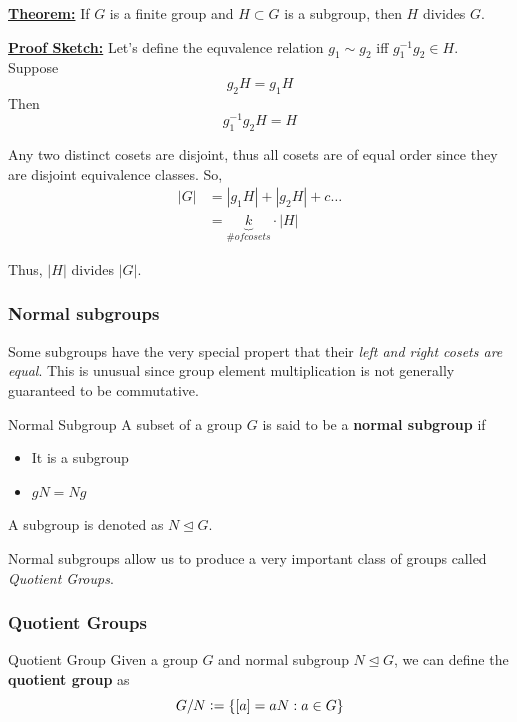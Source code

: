 \documentclass{article}
\newcommand{\defeq}{\vcentcolon=}
\begin{document}
\vskip 0.5cm
\begin{dottedbox}
  \underline{\textbf{Theorem:}} If $G$ is a finite group and $H \subset G$ is a subgroup, then $H$ divides $G$.

  \vskip 0.5cm
  \underline{\textbf{Proof Sketch:}} Let's define the equvalence relation $g_1 \sim g_2$ iff $g_1^{-1} g_2 \in H$. Suppose 
  \[ g_2 H = g_1 H \]
  Then 
  \[ g_1^{-1}g_2 H = H \]
  
  Any two distinct cosets are disjoint, thus all cosets are of equal order since they are disjoint equivalence classes. So, 
  \begin{align}
    \lvert G \rvert &= |g_1 H| + |g_2 H| + c\dots \\
    &= \underbrace{k}_{\# of cosets} \cdot \lvert H \rvert
  \end{align}

  Thus, $\lvert H \rvert$ divides $\lvert G \rvert$.
\end{dottedbox}

\vskip 1cm
\subsubsection{Normal subgroups}

\vskip 0.5cm
Some subgroups have the very special propert that their \emph{left and right cosets are equal}. This is unusual since group element multiplication is not generally guaranteed to be commutative.

\begin{mathdefinitionbox}{Normal Subgroup}
\vskip 0.5cm
  A subset of a group $G$ is said to be a \textbf{normal subgroup} if 
  \begin{itemize}
    \item It is a subgroup
    \item $gN = Ng$ 
  \end{itemize}
  A subgroup is denoted as $N \trianglelefteq G$.
\end{mathdefinitionbox}

\vskip 0.5cm
Normal subgroups allow us to produce a very important class of groups called \emph{Quotient Groups}.

\vskip 1cm
\subsubsection{Quotient Groups}

\vskip 0.5cm

\begin{mathdefinitionbox}{Quotient Group}
\vskip 0.5cm
  Given a group $G$ and normal subgroup $N \trianglelefteq G$, we can define the \textbf{quotient group} as 
  \[ G/N \defeq \{ [a] = aN : a \in G \} \]
\end{mathdefinitionbox}
\end{document}

